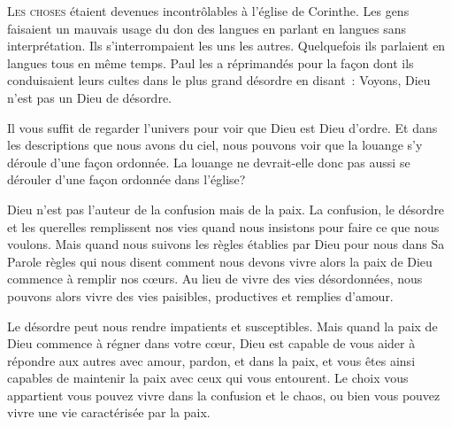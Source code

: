 \lettrine{L}{es choses} étaient devenues incontrôlables
 à l'église de Corinthe.
 Les gens faisaient un mauvais usage du don des langues
 en parlant en langues sans interprétation.
 Ils s'interrompaient les uns les autres.
 Quelquefois ils parlaient en langues tous en même temps.
 Paul les a réprimandés pour la fa\c{c}on dont ils conduisaient
 leurs cultes dans le plus grand désordre en disant~: 
 \Og Voyons, Dieu n'est pas un Dieu de désordre. \Fg{}

Il vous suffit de regarder l'univers
 pour voir que Dieu est Dieu d'ordre.
 Et dans les descriptions que nous avons du ciel,
 nous pouvons voir que la louange s'y déroule d'une fa\c{c}on ordonnée.
 La louange ne devrait-elle donc pas aussi se dérouler
 d'une fa\c{c}on ordonnée dans l'église?


Dieu n'est pas l'auteur de la confusion mais de la paix.
 La confusion, le désordre et les querelles remplissent nos vies
 quand nous insistons pour faire ce que nous voulons.
 Mais quand nous suivons les règles établies par Dieu pour nous dans Sa Parole
 \ocadr règles qui nous disent comment nous devons vivre \fcadr{}
 alors la paix de Dieu commence à remplir nos c\oe{}urs.
 Au lieu de vivre des vies désordonnées,
 nous pouvons alors vivre des vies paisibles, productives et remplies d'amour.

Le désordre peut nous rendre impatients et susceptibles.
 Mais quand la paix de Dieu commence à régner dans votre c\oe{}ur,
 Dieu est capable de vous aider à répondre aux autres avec amour,
 pardon, et dans la paix, et vous êtes ainsi capables de maintenir
 la paix avec ceux qui vous entourent.
 Le choix vous appartient \ocadr vous pouvez vivre dans la confusion et le chaos,
 ou bien vous pouvez vivre une vie caractérisée par la paix.

\dvrule






